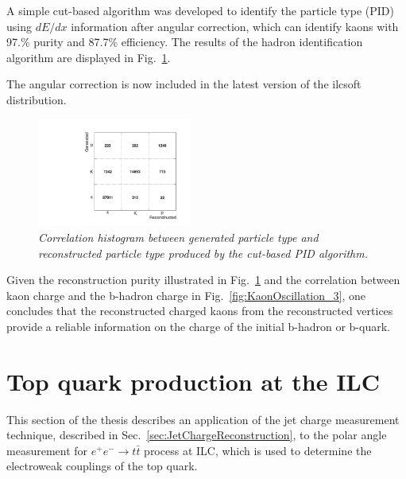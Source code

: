 A simple cut-based algorithm was developed to identify the particle type (PID) using $dE/dx$ information after angular correction, which can identify kaons with 97.\% purity and 87.7\% efficiency.
The results of the hadron identification algorithm are displayed in Fig.~\ref{fig:dEdxResults_3}.

The angular correction is now included in the latest version of the {\sc ilcsoft} distribution.

\begin{figure}
{\centering
    \includegraphics[width=0.45\textwidth]{ILD/plots/dedx-results.pdf}
    \caption{\sl Correlation histogram between generated particle type and reconstructed particle type produced by the cut-based PID algorithm.
    }
    \label{fig:dEdxResults_3}
  }
 
\end{figure}


Given the reconstruction purity illustrated in Fig.~\ref{fig:dEdxResults_3} and the correlation between kaon charge and the b-hadron charge in Fig.~\ref{fig:KaonOscillation_3}, one concludes that the reconstructed charged kaons from the reconstructed vertices provide a reliable information on the charge of the initial b-hadron or b-quark. 



\newpage
\section{Top quark production at the ILC}
This section of the thesis describes an application of the jet charge measurement technique, described in Sec.~\ref{sec:JetChargeReconstruction}, to the polar angle measurement for $e^+e^- \to t\bar{t}$ process at ILC, which is used to determine the electroweak couplings of the top quark.


